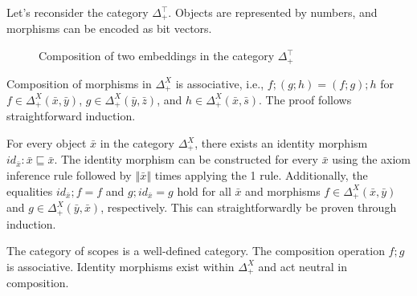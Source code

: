 \documentclass[runningheads]{llncs}
\begin{document}
\begin{example}
  Let's reconsider the category $Δ_+^⊤$. Objects are represented by numbers, and morphisms can be encoded as bit vectors.
  \begin{figure}[ht]
    \centering
    \caption{Composition of two embeddings in the category $Δ_+^⊤$}
    \label{fig:ex2}
  \end{figure}
\end{example}
\begin{corollary}
  Composition of morphisms in $Δ_+^X$ is associative, i.e., $f; (g; h) = (f; g); h$ for $f ∈ Δ_+^X(\bar{x}, \bar{y})$, $g ∈ Δ_+^X(\bar{y}, \bar{z})$, and $h ∈ Δ_+^X(\bar{x}, \bar{s})$. 
  The proof follows straightforward induction.
\end{corollary}
\begin{corollary}
  For every object $\bar{x}$ in the category $Δ_+^X$, there exists an identity morphism $id_{\bar{x}} : \bar{x} ⊑ \bar{x}$. The identity morphism can be constructed for every $\bar{x}$ using the axiom inference rule followed by $‖\bar{x}‖$ times applying the 1 rule. 
  Additionally, the equalities $id_{\bar{x}} ; f = f$ and $g ; id_{\bar{x}} = g$ hold for all $\bar{x}$ and morphisms $f ∈ Δ_+^X(\bar{x}, \bar{y})$ and $g ∈ Δ_+^X(\bar{y}, \bar{x})$, respectively. 
  This can straightforwardly be proven through induction.
\end{corollary}
\begin{proposition}
  The category of scopes is a well-defined category. 
  The composition operation $f;g$ is associative. 
  Identity morphisms exist within $Δ_+^X$ and act neutral in composition.
\end{proposition}
\end{document}
